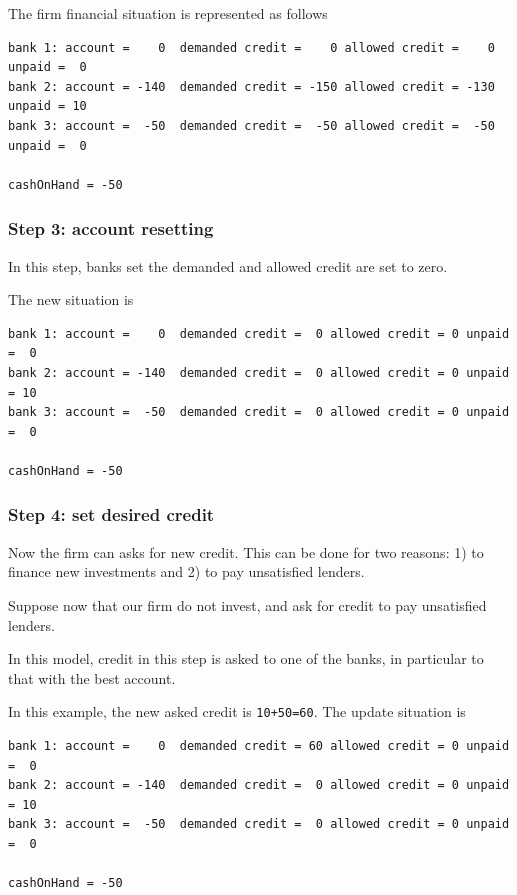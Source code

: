\documentclass{article}
\begin{document}
The firm financial situation is represented as follows

\begin{verbatim}
bank 1: account =    0  demanded credit =    0 allowed credit =    0 unpaid =  0
bank 2: account = -140  demanded credit = -150 allowed credit = -130 unpaid = 10
bank 3: account =  -50  demanded credit =  -50 allowed credit =  -50 unpaid =  0

cashOnHand = -50
\end{verbatim}

\subsubsection*{Step 3: account resetting}
In this step, banks set the demanded and allowed credit are set to zero.

The new situation is

\begin{verbatim}
bank 1: account =    0  demanded credit =  0 allowed credit = 0 unpaid =  0
bank 2: account = -140  demanded credit =  0 allowed credit = 0 unpaid = 10
bank 3: account =  -50  demanded credit =  0 allowed credit = 0 unpaid =  0

cashOnHand = -50
\end{verbatim}



\subsubsection*{Step 4: set desired credit}

Now the firm can asks for new credit. This can be done for two reasons: 1) to finance new investments and 2) to pay unsatisfied lenders.

Suppose now that our firm do not invest, and ask for credit to pay unsatisfied lenders.

In this model, credit in this step is asked to one of the banks, in particular to that with the best account.

In this example, the new asked credit is \verb/10+50=60/. The update situation is 

\begin{verbatim}
bank 1: account =    0  demanded credit = 60 allowed credit = 0 unpaid =  0
bank 2: account = -140  demanded credit =  0 allowed credit = 0 unpaid = 10
bank 3: account =  -50  demanded credit =  0 allowed credit = 0 unpaid =  0

cashOnHand = -50
\end{verbatim}
\end{document}
